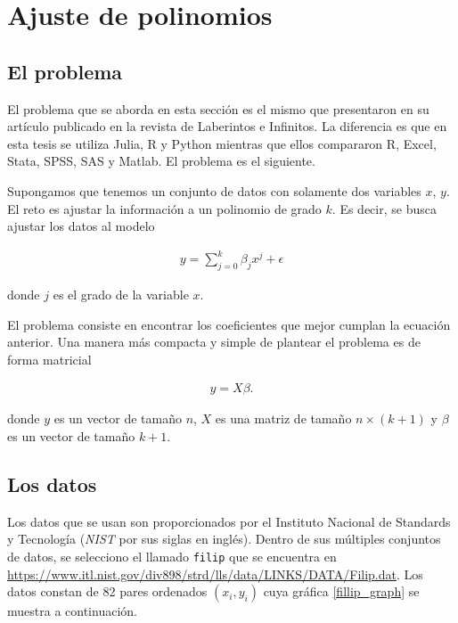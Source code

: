 \chapter{Ajuste de polinomios} \label{cap_polinomios}

\section{El problema}
El problema que se aborda en esta sección es el mismo que presentaron \cite{laberintos} en su artículo publicado en la revista de Laberintos e Infinitos. La diferencia es que en esta tesis se utiliza \textsf{Julia, R} y \textsf{Python}  mientras que ellos compararon \textsf{R, Excel, Stata, SPSS, SAS} y \textsf{Matlab}. El problema es el siguiente.

Supongamos que tenemos un conjunto de datos con solamente dos variables $x$, $y$. El reto es ajustar la información a un polinomio de grado $k$. Es decir, se busca ajustar los datos al modelo

\begin{equation*} 
    \begin{aligned}
    y = \sum_{j = 0}^{k} \beta_j x^j + \epsilon
    \end{aligned}
\end{equation*}

donde $j$ es el grado de la variable $x$. 

El problema consiste en encontrar los coeficientes que mejor cumplan la ecuación anterior. Una manera más compacta y simple de plantear el problema es de forma matricial 

\begin{equation} \label{eq_matricial_pol}
    \begin{aligned}
    y = X \beta.
    \end{aligned}
\end{equation}

donde $y$ es un vector de tamaño $n$, $X$ es una matriz de tamaño $n \times (k + 1)$ y $\beta$ es un vector de tamaño $k + 1$. 


\section{Los datos}
Los datos que se usan son proporcionados por el Instituto Nacional de Standards y Tecnología (\textit{NIST} por sus siglas en inglés). Dentro de sus múltiples conjuntos de datos, se selecciono el llamado \texttt{filip} que se encuentra en \url{https://www.itl.nist.gov/div898/strd/lls/data/LINKS/DATA/Filip.dat}. Los datos constan de 82 pares ordenados $(x_i, y_i)$ cuya gráfica \ref{fillip_graph} se muestra a continuación. 

